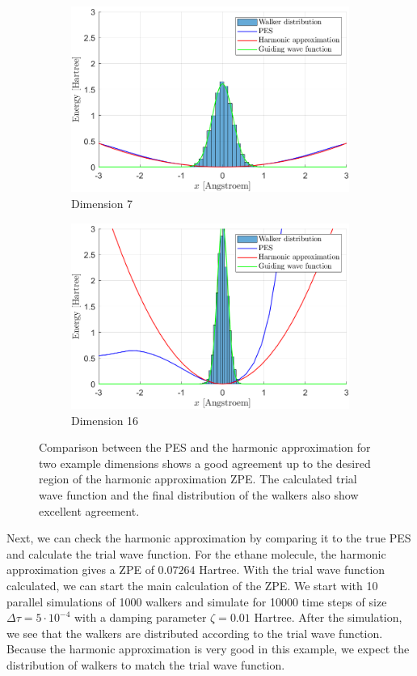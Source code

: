 \documentclass [12pt]{report}
\begin{document}
\begin{figure}[h]
\begin{subfigure}{0.5\textwidth}
\includegraphics[width=\linewidth]{walkers1.png} 
\caption{Dimension 7}
\label{dim7}
\end{subfigure}
\begin{subfigure}{0.5\textwidth}
\includegraphics[width=\linewidth]{walkers2.png}
\caption{Dimension 16}
\label{dim16}
\end{subfigure}
\caption{Comparison between the PES and the harmonic approximation for two example dimensions shows a good agreement up to the desired region of the harmonic approximation ZPE. The calculated trial wave function and the final distribution of the walkers also show excellent agreement.}
\label{trialwf}
\end{figure}
Next, we can check the harmonic approximation by comparing it to the true PES and calculate the trial wave function. For the ethane molecule, the harmonic approximation gives a ZPE of $0.07264$ Hartree. With the trial wave function calculated, we can start the main calculation of the ZPE. We start with 10 parallel simulations of 1000 walkers and simulate for 10000 time steps of size $\Delta \tau = 5 \cdot 10^{-4}$ with a damping parameter $\zeta = 0.01$ Hartree. After the simulation, we see that the walkers are distributed according to the trial wave function. Because the harmonic approximation is very good in this example, we expect the distribution of walkers to match the trial wave function.
\end{document}
